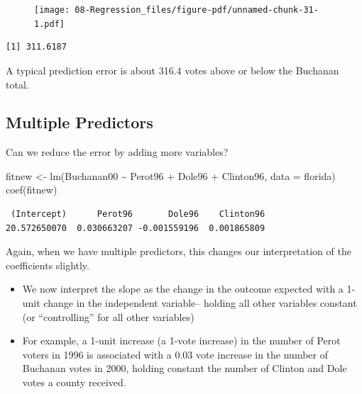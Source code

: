 \documentclass[
  letterpaper,
  DIV=11,
  numbers=noendperiod]{scrreprt}
\newenvironment{Shaded}{\begin{snugshade}}{\end{snugshade}}
\newcommand{\AttributeTok}[1]{\textcolor[rgb]{0.40,0.45,0.13}{#1}}
\newcommand{\DecValTok}[1]{\textcolor[rgb]{0.68,0.00,0.00}{#1}}
\newcommand{\FunctionTok}[1]{\textcolor[rgb]{0.28,0.35,0.67}{#1}}
\newcommand{\NormalTok}[1]{\textcolor[rgb]{0.00,0.23,0.31}{#1}}
\newcommand{\OtherTok}[1]{\textcolor[rgb]{0.00,0.23,0.31}{#1}}
\newcommand{\SpecialCharTok}[1]{\textcolor[rgb]{0.37,0.37,0.37}{#1}}
\providecommand{\tightlist}{%
  \setlength{\itemsep}{0pt}\setlength{\parskip}{0pt}}\usepackage{longtable,booktabs,array}
\begin{document}
\begin{figure}[H]

{\centering \texttt{[image: 08-Regression\_files/figure-pdf/unnamed-chunk-31-1.pdf]}

}

\end{figure}

\begin{Shaded}
\end{Shaded}

\begin{verbatim}
[1] 311.6187
\end{verbatim}

A typical prediction error is about 316.4 votes above or below the
Buchanan total.

\hypertarget{multiple-predictors}{%
\subsection{Multiple Predictors}\label{multiple-predictors}}

Can we reduce the error by adding more variables?

\begin{Shaded}
\begin{Highlighting}[]
\NormalTok{fitnew }\OtherTok{\textless{}{-}} \FunctionTok{lm}\NormalTok{(Buchanan00 }\SpecialCharTok{\textasciitilde{}}\NormalTok{ Perot96 }\SpecialCharTok{+}\NormalTok{ Dole96 }\SpecialCharTok{+}\NormalTok{ Clinton96, }\AttributeTok{data =}\NormalTok{ florida)}
\FunctionTok{coef}\NormalTok{(fitnew)}
\end{Highlighting}
\end{Shaded}

\begin{verbatim}
 (Intercept)      Perot96       Dole96    Clinton96 
20.572650070  0.030663207 -0.001559196  0.001865809 
\end{verbatim}

Again, when we have multiple predictors, this changes our interpretation
of the coefficients slightly.

\begin{itemize}
\tightlist
\item
  We now interpret the slope as the change in the outcome expected with
  a 1-unit change in the independent variable-- holding all other
  variables constant (or ``controlling'' for all other variables)
\item
  For example, a 1-unit increase (a 1-vote increase) in the number of
  Perot voters in 1996 is associated with a 0.03 vote increase in the
  number of Buchanan votes in 2000, holding constant the number of
  Clinton and Dole votes a county received.
\end{itemize}
\end{document}
